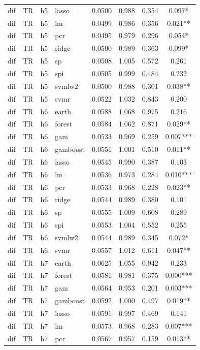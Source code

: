 \begin{ThreePartTable}
\begin{longtable}[t]{llclcccc}
dif & TR & h5 & lasso & 0.0500 & 0.988 & 0.354 & 0.097*\\
dif & TR & h5 & lm & 0.0499 & 0.986 & 0.356 & 0.021**\\
dif & TR & h5 & pcr & 0.0495 & 0.979 & 0.296 & 0.054*\\
dif & TR & h5 & ridge & 0.0500 & 0.989 & 0.363 & 0.099*\\
dif & TR & h5 & sp & 0.0508 & 1.005 & 0.572 & 0.261\\
dif & TR & h5 & spi & 0.0505 & 0.999 & 0.484 & 0.232\\
dif & TR & h5 & svmlw2 & 0.0500 & 0.988 & 0.301 & 0.038**\\
dif & TR & h5 & svmr & 0.0522 & 1.032 & 0.843 & 0.200\\
\addlinespace
dif & TR & h6 & earth & 0.0588 & 1.068 & 0.975 & 0.216\\
dif & TR & h6 & forest & 0.0584 & 1.062 & 0.871 & 0.029**\\
dif & TR & h6 & gam & 0.0533 & 0.969 & 0.259 & 0.007***\\
dif & TR & h6 & gamboost & 0.0551 & 1.001 & 0.510 & 0.011**\\
dif & TR & h6 & lasso & 0.0545 & 0.990 & 0.387 & 0.103\\
dif & TR & h6 & lm & 0.0536 & 0.973 & 0.284 & 0.010***\\
dif & TR & h6 & pcr & 0.0533 & 0.968 & 0.228 & 0.023**\\
dif & TR & h6 & ridge & 0.0544 & 0.989 & 0.380 & 0.101\\
dif & TR & h6 & sp & 0.0555 & 1.009 & 0.608 & 0.289\\
dif & TR & h6 & spi & 0.0553 & 1.004 & 0.552 & 0.255\\
dif & TR & h6 & svmlw2 & 0.0544 & 0.989 & 0.345 & 0.072*\\
dif & TR & h6 & svmr & 0.0557 & 1.012 & 0.611 & 0.047**\\
\addlinespace
dif & TR & h7 & earth & 0.0625 & 1.055 & 0.942 & 0.233\\
dif & TR & h7 & forest & 0.0581 & 0.981 & 0.375 & 0.000***\\
dif & TR & h7 & gam & 0.0564 & 0.953 & 0.201 & 0.003***\\
dif & TR & h7 & gamboost & 0.0592 & 1.000 & 0.497 & 0.019**\\
dif & TR & h7 & lasso & 0.0591 & 0.997 & 0.469 & 0.141\\
dif & TR & h7 & lm & 0.0573 & 0.968 & 0.283 & 0.007***\\
dif & TR & h7 & pcr & 0.0567 & 0.957 & 0.159 & 0.013**\\

\end{longtable}
\end{ThreePartTable}
